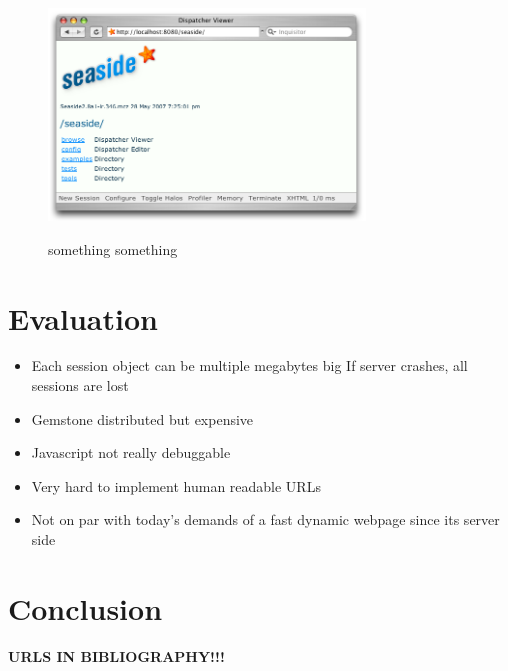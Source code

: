\documentclass[a4paper,12pt,pagesize,headsepline,oribibl,titlepage]{scrartcl}
\begin{document}
\begin{figure}[hbp]
\begin{center}
\includegraphics*[width=0.75\textwidth]{images/toolbar.png}\\
\caption{something something}
\label{abb:test}
\end{center}
\end{figure}

\section{Evaluation}
\label{sec:evaluation}

\begin{itemize}
\item Each session object can be multiple megabytes big If server crashes, all sessions are lost
\item Gemstone distributed but expensive
\item Javascript not really debuggable
\item Very hard to implement human readable URLs
\item Not on par with today’s demands of a fast dynamic webpage since its server side
\end{itemize}

\section{Conclusion}
\label{sec:conclusion}

\textbf{URLS IN BIBLIOGRAPHY!!!}

\newpage
\nocite{*}


\end{document}
